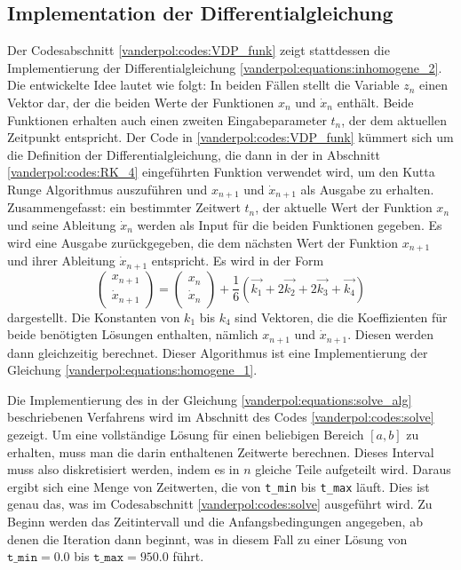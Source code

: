\subsection{Implementation der Differentialgleichung
\label{vanderpol:subsection:diff}}
Der Codesabschnitt \ref{vanderpol:codes:VDP_funk} zeigt stattdessen die Implementierung der Differentialgleichung \eqref{vanderpol:equations:inhomogene_2}. Die entwickelte Idee lautet wie folgt: In beiden Fällen stellt die Variable $z_n$ einen Vektor dar, der die beiden Werte der Funktionen $x_n$ und $\dot{x}_n$ enthält. Beide Funktionen erhalten auch einen zweiten Eingabeparameter $t_n$, der dem aktuellen Zeitpunkt entspricht. Der Code in \ref{vanderpol:codes:VDP_funk} kümmert sich um die Definition der Differentialgleichung, die dann in der in Abschnitt \ref{vanderpol:codes:RK_4} eingeführten Funktion verwendet wird, um den Kutta Runge Algorithmus auszuführen und $x_{n+1}$ und $\dot{x}_{n+1}$ als Ausgabe zu erhalten. Zusammengefasst: ein bestimmter Zeitwert $t_n$, der aktuelle Wert der Funktion $x_{n}$ und seine Ableitung $\dot{x}_{n}$ werden als Input für die beiden Funktionen gegeben. Es wird eine Ausgabe zurückgegeben, die dem nächsten Wert der Funktion $x_{n+1}$ und ihrer Ableitung $\dot{x}_{n+1}$ entspricht. Es wird in der Form
\begin{equation}
\begin{pmatrix}x_{n+1} \\ \dot{x}_{n+1} \end{pmatrix} = \begin{pmatrix}x_{n} \\ \dot{x}_{n} \end{pmatrix} + \frac{1}{6}(\vec{k_1} + 2\vec{k_2} + 2\vec{k_3} + \vec{k_4})
\label{vanderpol:equations:solve_alg}
\end{equation}
dargestellt. Die Konstanten von $k_1$ bis $k_4$ sind Vektoren, die die Koeffizienten für beide benötigten Lösungen enthalten, nämlich $x_{n+1}$ und $\dot{x}_{n+1}$.
Diesen werden dann gleichzeitig berechnet. Dieser Algorithmus ist eine Implementierung der Gleichung \eqref{vanderpol:equations:homogene_1}.

Die Implementierung des in der Gleichung \eqref{vanderpol:equations:solve_alg} beschriebenen Verfahrens wird im Abschnitt des Codes \ref{vanderpol:codes:solve} gezeigt.
Um eine vollständige Lösung für einen beliebigen Bereich $[a, b]$ zu erhalten, muss man die darin enthaltenen Zeitwerte berechnen. Dieses Interval muss also diskretisiert werden, indem es in $n$ gleiche Teile aufgeteilt wird. Daraus ergibt sich eine Menge von Zeitwerten, die von \texttt{t\_min} bis \texttt{t\_max} läuft.
Dies ist genau das, was im Codesabschnitt \ref{vanderpol:codes:solve} ausgeführt wird. Zu Beginn werden das Zeitintervall und die Anfangsbedingungen angegeben, ab denen die Iteration dann beginnt, was in diesem Fall zu einer Lösung von $\texttt{t\_min}=0.0$ bis $\texttt{t\_max}=950.0$ führt.